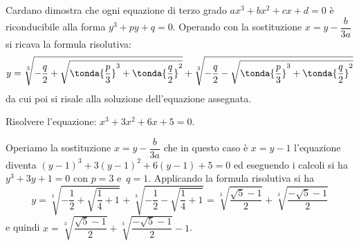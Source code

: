 Cardano dimostra che ogni equazione di terzo grado \(ax^3+bx^2+cx+d=0\) è 
riconducibile alla forma \(y^3+{py}+q=0\). Operando con la sostituzione 
\(x=y-\dfrac 
b{3a}\) si ricava la formula risolutiva: 
\[y=\sqrt[3]{-\dfrac q 2+\sqrt{\tonda{\dfrac p 3}^3+\tonda{\dfrac q 
2}^2}}+\sqrt[3]{-\dfrac q 2-\sqrt{\tonda{\dfrac p 
3}^3+\tonda{\dfrac 
q 
2}^2}}\] 
da cui poi si risale alla soluzione dell'equazione assegnata.
\begin{esempio}
Risolvere l'equazione: \(x^3+3x^2+6x+5=0\).

Operiamo la sostituzione \(x=y-\dfrac b{3a}\) che in questo caso è \(x=y-1\) 
l'equazione diventa \((y-1)^3+3(y-1)^2+6(y-1)+5=0\) ed eseguendo i calcoli si 
ha 
\(y^3+3y+1=0\) con \(p=3\) e~\(q=1\).
Applicando la formula risolutiva si ha 
\[y=\sqrt[3]{-\dfrac 1 2+\sqrt{\dfrac 1 4+1}}+\sqrt[3]{-\dfrac 1 2-\sqrt{\dfrac 
1 
4+1}}=\sqrt[3]{\dfrac{\sqrt 5-1} 2}+\sqrt[3]{\dfrac{-\sqrt 5-1} 2}\] 
e quindi \(x=\sqrt[3]{\dfrac{\sqrt 5-1} 2}+\sqrt[3]{\dfrac{-\sqrt 5-1} 2}-1\).
\end{esempio}


